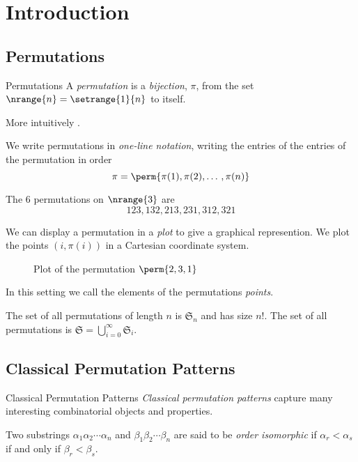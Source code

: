 \section{Introduction}
\label{sec:Introduction}
\subsection{Permutations}
\label{sub:Permutations}

\begin{frame}{Permutations}
  A \emph{permutation} is a \emph{bijection}, \(\pi\), from the set
  \(\nrange{n} = \setrange{1}{n}\) to itself.

  More intuitively .

  We write permutations in \emph{one-line notation}, writing the entries of
  the entries of the permutation in order
  \begin{equation*}
    \pi = \perm{\pi(1),\pi(2),\dotso,\pi(n)}
  \end{equation*}
  \begin{example} The \(6\) permutations on \(\nrange{3}\) are
    \begin{equation*}
      123, 132, 213, 231, 312, 321
    \end{equation*}
  \end{example}
\end{frame}

\begin{frame}
  We can display a permutation in a \emph{plot} to give a graphical
  represention. We plot the points \((i,\pi(i))\) in a Cartesian coordinate
  system.
  \begin{figure}[htb]
    \centering
    \caption{Plot of the permutation \(\perm{2,3,1}\)}
  \end{figure}
  In this setting we call the elements of the permutations \emph{points}.

  The set of all permutations of length \(n\) is \(\mathfrak{S}_n\) and
  has size \(n!\). The set of all permutations is
  \(\mathfrak{S}=\bigcup_{i=0}^{\infty}\mathfrak{S}_i\).
\end{frame}
\subsection{Classical Permutation Patterns}
\label{sub:Classical Permutation Patterns}

\begin{frame}{Classical Permutation Patterns}
  \emph{Classical permutation patterns} capture many interesting combinatorial
  objects and properties.

  \begin{definition}
    Two substrings \(\alpha_1\alpha_2\dotsm\alpha_n\) and
    \(\beta_1\beta_2\dotsm\beta_n\) are said to be \emph{order isomorphic}
    if \(\alpha_r<\alpha_s\) if and only if \(\beta_r<\beta_s\).
  \end{definition}
\end{frame}

